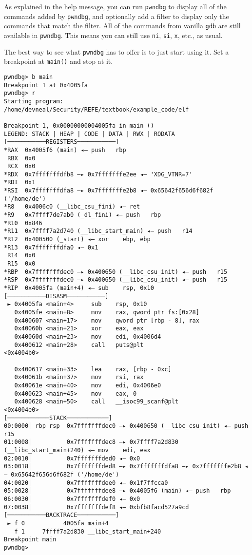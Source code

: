 \documentclass{article}
\begin{document}
As explained in the help message, you can run \texttt{pwndbg} to display all of
the commands added by \texttt{pwndbg}, and optionally add a filter to display
only the commands that match the filter. All of the commands from vanilla
\texttt{gdb} are still available in \texttt{pwndbg}. This means you can still
use \texttt{ni}, \texttt{si}, \texttt{x}, etc., as usual.


The best way to see what \texttt{pwndbg} has to offer is to just start using it.
Set a breakpoint at \texttt{main()} and stop at it.

\begin{lstlisting}
pwndbg> b main
Breakpoint 1 at 0x4005fa
pwndbg> r
Starting program: /home/devneal/Security/REFE/textbook/example_code/elf 

Breakpoint 1, 0x00000000004005fa in main ()
LEGEND: STACK | HEAP | CODE | DATA | RWX | RODATA
[───────────REGISTERS───────────]
*RAX  0x4005f6 (main) ◂— push   rbp
 RBX  0x0
 RCX  0x0
*RDX  0x7fffffffdfb8 —▸ 0x7fffffffe2ee ◂— 'XDG_VTNR=7'
*RDI  0x1
*RSI  0x7fffffffdfa8 —▸ 0x7fffffffe2b8 ◂— 0x65642f656d6f682f ('/home/de')
*R8   0x4006c0 (__libc_csu_fini) ◂— ret    
*R9   0x7ffff7de7ab0 (_dl_fini) ◂— push   rbp
*R10  0x846
*R11  0x7ffff7a2d740 (__libc_start_main) ◂— push   r14
*R12  0x400500 (_start) ◂— xor    ebp, ebp
*R13  0x7fffffffdfa0 ◂— 0x1
 R14  0x0
 R15  0x0
*RBP  0x7fffffffdec0 —▸ 0x400650 (__libc_csu_init) ◂— push   r15
*RSP  0x7fffffffdec0 —▸ 0x400650 (__libc_csu_init) ◂— push   r15
*RIP  0x4005fa (main+4) ◂— sub    rsp, 0x10
[───────────DISASM───────────]
 ► 0x4005fa <main+4>     sub    rsp, 0x10
   0x4005fe <main+8>     mov    rax, qword ptr fs:[0x28]
   0x400607 <main+17>    mov    qword ptr [rbp - 8], rax
   0x40060b <main+21>    xor    eax, eax
   0x40060d <main+23>    mov    edi, 0x4006d4
   0x400612 <main+28>    call   puts@plt                      <0x4004b0>
 
   0x400617 <main+33>    lea    rax, [rbp - 0xc]
   0x40061b <main+37>    mov    rsi, rax
   0x40061e <main+40>    mov    edi, 0x4006e0
   0x400623 <main+45>    mov    eax, 0
   0x400628 <main+50>    call   __isoc99_scanf@plt            <0x4004e0>
[────────────STACK────────────]
00:0000│ rbp rsp  0x7fffffffdec0 —▸ 0x400650 (__libc_csu_init) ◂— push   r15
01:0008│          0x7fffffffdec8 —▸ 0x7ffff7a2d830 (__libc_start_main+240) ◂— mov    edi, eax
02:0010│          0x7fffffffded0 ◂— 0x0
03:0018│          0x7fffffffded8 —▸ 0x7fffffffdfa8 —▸ 0x7fffffffe2b8 ◂— 0x65642f656d6f682f ('/home/de')
04:0020│          0x7fffffffdee0 ◂— 0x1f7ffcca0
05:0028│          0x7fffffffdee8 —▸ 0x4005f6 (main) ◂— push   rbp
06:0030│          0x7fffffffdef0 ◂— 0x0
07:0038│          0x7fffffffdef8 ◂— 0xbfb8facd527a9cd
[───────────BACKTRACE───────────]
 ► f 0           4005fa main+4
   f 1     7ffff7a2d830 __libc_start_main+240
Breakpoint main
pwndbg> 
\end{lstlisting}
\end{document}
